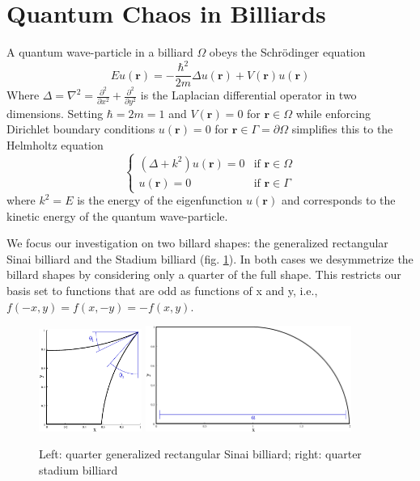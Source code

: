 \documentclass{report}
\newcommand{\rr}[0]{\mathbf{r}}
\begin{document}
\section{Quantum Chaos in Billiards}
\label{sec:billiards}
A quantum wave-particle in a billiard $\Omega$ obeys the Schr\"odinger equation
\[
E u(\rr) = - \frac{\hbar^{2}}{2m} \Delta u(\rr) + V(\rr) u(\rr)
\]
Where $\Delta = \nabla^{2} = \frac{\partial^{2}}{\partial x^{2}} + \frac{\partial^{2}}{\partial y^{2}}$ is the Laplacian differential operator in two dimensions. Setting $\hbar = 2m = 1$ and $V(\rr) = 0$ for $\rr \in \Omega$ while enforcing Dirichlet boundary conditions $u(\rr) = 0$ for $\rr \in \Gamma = \partial \Omega$ simplifies this to the Helmholtz equation
\begin{equation}
\label{eq:helmholtz}
\begin{cases}
(\Delta + k^{2})u(\rr) = 0 & \text{if } \rr \in \Omega\\
  u(\rr) = 0 & \text{if } \rr \in \Gamma
\end{cases}
\end{equation}
where $k^{2} = E$ is the energy of the eigenfunction $u(\rr)$ and corresponds to the kinetic energy of the quantum wave-particle.

We focus our investigation on two billard shapes: the generalized rectangular Sinai billiard and the Stadium billiard (fig. \ref{fig:billiards}). In both cases we desymmetrize the billard shapes by considering only a quarter of the full shape. This restricts our basis set to functions that are odd as functions of x and y, i.e., $f(-x,y) = f(x,-y) = -f(x,y)$.

\begin{figure}
  \begin{center}
    \includegraphics[width=0.3\textwidth]{figs/domains/qugrs_fig.eps}
    \includegraphics[width=0.6\textwidth]{figs/domains/qust_fig.eps}
    \caption{Left: quarter generalized rectangular Sinai billiard; right: quarter stadium billiard}
    \label{fig:billiards}
  \end{center}
\end{figure}
\end{document}
